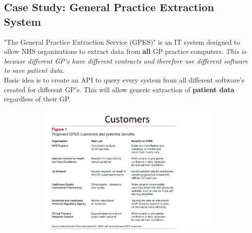 \documentclass[a4paper]{article}
\begin{document}
\subsection{Case Study: General Practice Extraction System}

"The General Practice Extraction Service (GPES)" is an IT system designed to allow NHS organizations to extract data from \textbf{all} GP practice computers. \textit{This is because different GP's have different contracts and therefore use different software to save patient data.}\\

Basic idea is to create an API to query every system from all different software's created for different GP's. This will allow generic extraction of \textbf{patient data} regardless of their GP.

\begin{figure}[H]
\centering
\begin{subfigure}{1\textwidth}
  \includegraphics[width=1\linewidth]
  {images/1-customers.png}
\end{subfigure}
\end{figure}
\end{document}
